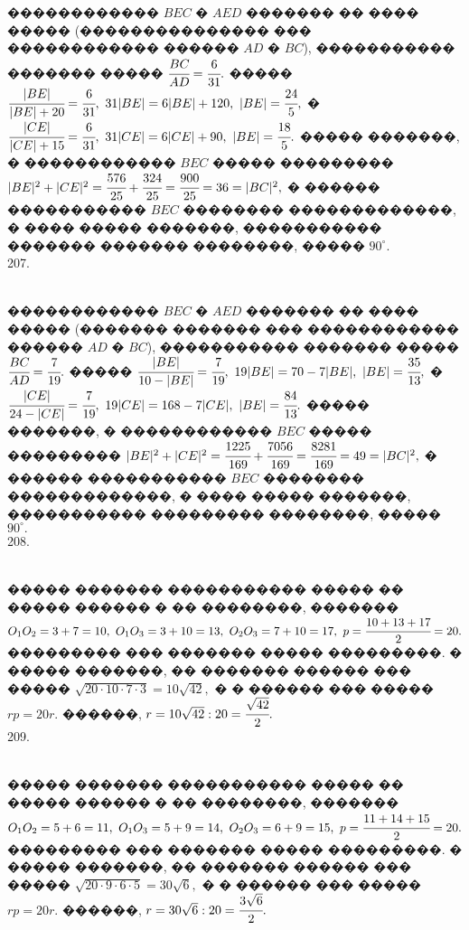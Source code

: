 \documentclass[12pt]{article}
\begin{document}
������������ $BEC$ � $AED$ ������� �� ���� ����� (��������������� ��� ������������ ������ $AD$ � $BC$), ����������� ������� ����� $\cfrac{BC}{AD}=
\cfrac{6}{31}.$ ����� $\cfrac{|BE|}{|BE|+20}=\cfrac{6}{31},\ 31|BE|=6|BE|+120,\ |BE|=\cfrac{24}{5},$ � $\cfrac{|CE|}{|CE|+15}=\cfrac{6}{31},\ 31|CE|=6|CE|+90,\ |BE|=\cfrac{18}{5}.$ ����� �������, � ������������ $BEC$ ����� ��������� $|BE|^2+|CE|^2=\cfrac{576}{25}+\cfrac{324}{25}=\cfrac{900}{25}=36=|BC|^2,$ � ������ ����������� $BEC$ �������� �������������, � ���� ����� �������, ����������� ������� ������� ��������, ����� $90^\circ.$\\
207. \begin{figure}[ht!]
\end{figure}\\
������������ $BEC$ � $AED$ ������� �� ���� ����� (������� ������� ��� ������������ ������ $AD$ � $BC$), ����������� ������� ����� $\cfrac{BC}{AD}=
\cfrac{7}{19}.$ ����� $\cfrac{|BE|}{10-|BE|}=\cfrac{7}{19},\ 19|BE|=70-7|BE|,\ |BE|=\cfrac{35}{13},$ � $\cfrac{|CE|}{24-|CE|}=\cfrac{7}{19},\ 19|CE|=168-7|CE|,\ |BE|=\cfrac{84}{13}.$ ����� �������, � ������������ $BEC$ ����� ��������� $|BE|^2+|CE|^2=\cfrac{1225}{169}+\cfrac{7056}{169}=\cfrac{8281}{169}=49=|BC|^2,$ � ������ ����������� $BEC$ �������� �������������, � ���� ����� �������, ����������� ��������� ��������, ����� $90^\circ.$\\
208. \begin{figure}[ht!]
\end{figure}\\
����� ������� ����������� ����� �� ����� ������ � �� ��������, ������� $O_1O_2=3+7=10,\ O_1O_3=3+10=13,\ O_2O_3=7+10=17,\ p=\cfrac{10+13+17}{2}=20.$ ��������� ��� ������� ����� ���������. � ����� �������, �� ������� ������ ��� ����� $\sqrt{20\cdot10\cdot7\cdot3}=10\sqrt{42},$ � � ������ ��� ����� $rp=20r.$ ������, $r=10\sqrt{42}:20=\cfrac{\sqrt{42}}{2}.$\\
209. \begin{figure}[ht!]
\end{figure}\\
����� ������� ����������� ����� �� ����� ������ � �� ��������, ������� $O_1O_2=5+6=11,\ O_1O_3=5+9=14,\ O_2O_3=6+9=15,\ p=\cfrac{11+14+15}{2}=20.$ ��������� ��� ������� ����� ���������. � ����� �������, �� ������� ������ ��� ����� $\sqrt{20\cdot9\cdot6\cdot5}=30\sqrt{6},$ � � ������ ��� ����� $rp=20r.$ ������, $r=30\sqrt{6}:20=\cfrac{3\sqrt{6}}{2}.$\\
\end{document}

